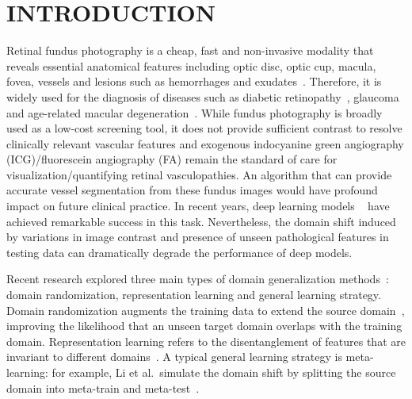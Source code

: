 \documentclass[]{spie}  %
\begin{document}
\section{INTRODUCTION}
\label{sec:intro} 
Retinal fundus photography is a cheap, fast and non-invasive modality that reveals essential anatomical features including optic disc, optic cup, macula, fovea, vessels and lesions such as hemorrhages and exudates~\cite{li2021applications}. Therefore, it is widely used for the diagnosis of diseases such as diabetic retinopathy~\cite{islam2020deep}, glaucoma~\cite{zhang2010origa} and age-related macular degeneration~\cite{spaide2003fundus}. %
While fundus photography is broadly used as a low-cost screening tool, it does not provide sufficient contrast to resolve clinically relevant vascular features and exogenous indocyanine green angiography (ICG)/fluorescein angiography (FA) remain the standard of care for visualization/quantifying retinal vasculopathies. An algorithm that can provide accurate vessel segmentation from these fundus images would have profound impact on future clinical practice. In recent years, deep learning  models ~\cite{chen2021retinal} have achieved remarkable success in this task. Nevertheless, the domain shift induced by variations in image contrast and presence of unseen pathological features in testing data can dramatically degrade the performance of deep models. 


Recent research explored three main types of domain generalization methods~\cite{wang2022generalizing}: domain randomization, representation learning and general learning strategy. Domain randomization augments the training data to extend the source domain~\cite{zhang2022semi}, improving the likelihood that an unseen target domain overlaps with the training domain. Representation learning refers to the disentanglement of features that are invariant to different domains~\cite{jiang2020unified}. A typical  general learning strategy is meta-learning: for example, Li et al.\ simulate the domain shift by splitting the source domain into meta-train and meta-test~\cite{li2018learning}. 
\end{document}
